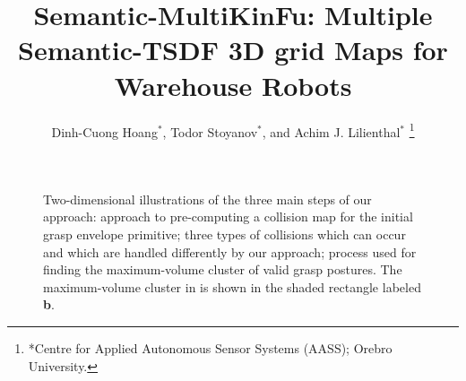\documentclass[usletter, 10pt, conference]{ieeeconf}
\title{Semantic-MultiKinFu: Multiple Semantic-TSDF 3D grid Maps for Warehouse Robots}
\author{Dinh-Cuong Hoang$^{*}$, Todor Stoyanov$^{*}$, and Achim J. Lilienthal$^{*}$%
\thanks{*Centre for Applied Autonomous Sensor Systems (AASS); Orebro University.}%
}
\begin{document}
\maketitle
\thispagestyle{empty}
\pagestyle{empty}
%
%

\begin{figure}[t!]
\centering
{}
\caption{Two-dimensional illustrations of the three main steps of our approach:  approach to pre-computing a collision map for the initial grasp envelope primitive;  three types of collisions which can occur and which are handled differently by our approach;  process used for finding the maximum-volume cluster of valid grasp postures. The maximum-volume cluster in  is shown in the shaded rectangle labeled \textbf{b}. }
\label{fig:method}
\end{figure}
%
%
\end{document}
